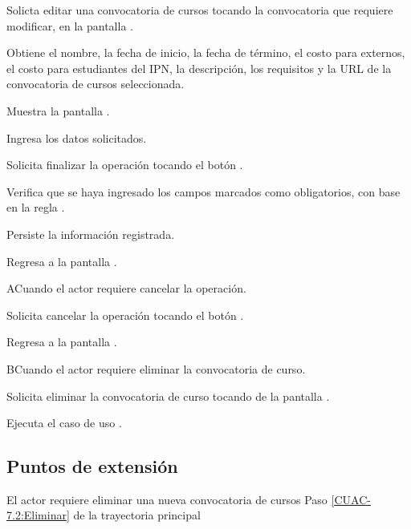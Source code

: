 	\begin{UCtrayectoria}
		
		\UCpaso [\UCactor] Solicta editar una convocatoria de cursos tocando la convocatoria que requiere modificar, en la pantalla .
		
		\UCpaso Obtiene el nombre, la fecha de inicio, la fecha de término, el costo para externos, el costo para estudiantes del IPN, la descripción, los requisitos y la URL de la convocatoria de cursos seleccionada.
		
		\UCpaso Muestra la pantalla .
		
		\UCpaso [\UCactor] Ingresa los datos solicitados.
		
		\UCpaso [\UCactor] Solicita finalizar la operación tocando el botón .  
		
		\UCpaso Verifica que se haya ingresado los campos marcados como obligatorios, con base en la regla .
		
		\UCpaso Persiste la información registrada.
		
		\UCpaso Regresa a la pantalla .
		
	\end{UCtrayectoria}

	\begin{UCtrayectoriaA}{A}{Cuando el actor requiere cancelar la operación.}
		
		\UCpaso [\UCactor] Solicita cancelar la operación tocando el botón .
		
		\UCpaso Regresa a la pantalla .
		
	\end{UCtrayectoriaA}

	\begin{UCtrayectoriaA}{B}{Cuando el actor requiere eliminar la convocatoria de curso.}
		
		\UCpaso [\UCactor] Solicita eliminar la convocatoria de curso tocando  de la pantalla .
		
		\UCpaso \label{CUAC-7.2:Eliminar} Ejecuta el caso de uso .
		
	\end{UCtrayectoriaA}

	\subsection{Puntos de extensión}
	
	\UCExtensionPoint
	{El actor requiere eliminar una nueva convocatoria de cursos}
	{ Paso \ref{CUAC-7.2:Eliminar} de la trayectoria principal}
	{}